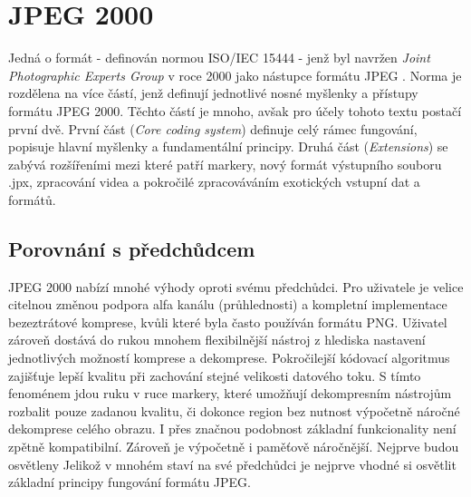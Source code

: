 \chapter{JPEG 2000}
\label{teorie}
Jedná o formát \cite{kniha} - definován normou ISO/IEC 15444 - jenž byl navržen \textit{Joint Photographic Experts Group} v roce 2000 jako nástupce formátu JPEG \cite{jpeg}. Norma je rozdělena na více částí, jenž definují jednotlivé nosné myšlenky a přístupy formátu JPEG 2000. Těchto částí je mnoho, avšak pro účely tohoto textu postačí první dvě. První část (\textit{Core coding system}) definuje celý rámec fungování, popisuje hlavní myšlenky a fundamentální principy. Druhá část (\textit{Extensions}) se zabývá rozšířeními mezi které patří markery, nový formát výstupního souboru .jpx, zpracování videa a pokročilé zpracováváním exotických vstupní dat a formátů.

\section{Porovnání s předchůdcem}
JPEG 2000 nabízí mnohé výhody oproti svému předchůdci. Pro uživatele je velice citelnou změnou podpora alfa kanálu (průhlednosti) a kompletní implementace bezeztrátové komprese, kvůli které byla často používán formátu PNG. Uživatel zároveň dostává do rukou mnohem flexibilnější nástroj z hlediska nastavení jednotlivých možností komprese a dekomprese. Pokročilejší kódovací algoritmus zajišťuje lepší kvalitu při zachování stejné velikosti datového toku. S tímto fenoménem jdou ruku v ruce markery, které umožňují dekompresním nástrojům rozbalit pouze zadanou kvalitu, či dokonce region bez nutnost výpočetně náročné dekomprese celého obrazu. I přes značnou podobnost základní funkcionality není zpětně kompatibilní. Zároveň je výpočetně i paměťově náročnější. Nejprve budou osvětleny Jelikož v mnohém staví na své předchůdci je nejprve vhodné si osvětlit základní principy fungování formátu JPEG. 


